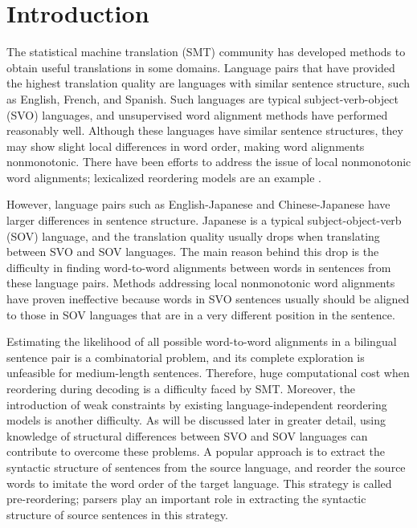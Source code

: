 \documentclass[english]{jnlp_1.4}
\begin{document}
\maketitle


\section{Introduction}
\label{sec:introduction}

The statistical machine translation (SMT) community has developed methods to 
obtain useful translations in some domains. Language pairs that have provided 
the highest translation quality are languages with similar sentence structure, 
such as English, French, and Spanish. Such languages are typical subject-verb-object (SVO) 
languages, and unsupervised word alignment methods \cite{Brown1993,Yamada2001,Zens2002,Koehn2003} 
have performed reasonably well. Although these languages have similar sentence 
structures, they may show slight local differences in word order, making word 
alignments nonmonotonic. There have been efforts to address the issue of local 
nonmonotonic word alignments; lexicalized reordering models are an example \cite{Tillmann2004,Koehn2005,Galley2008}.

However, language pairs such as English-Japanese and Chinese-Japanese have larger 
differences in sentence structure. Japanese is a typical subject-object-verb (SOV) 
language, and the translation quality usually drops when translating between SVO 
and SOV languages. The main reason behind this drop is the difficulty in finding 
word-to-word alignments between words in sentences from these language pairs. 
Methods addressing local nonmonotonic word alignments have proven ineffective 
because words in SVO sentences usually should be aligned to those in SOV languages 
that are in a very different position in the sentence.

Estimating the likelihood of all possible word-to-word alignments in a bilingual 
sentence pair is a combinatorial problem, and its complete exploration is unfeasible 
for medium-length sentences. Therefore, huge computational cost when reordering 
during decoding is a difficulty faced by SMT. Moreover, the introduction of weak 
constraints by existing language-independent reordering models is another difficulty. 
As will be discussed later in greater detail, using knowledge of structural differences 
between SVO and SOV languages can contribute to overcome these problems. A popular 
approach is to extract the syntactic structure of sentences from the source language, 
and reorder the source words to imitate the word order of the target language. This 
strategy is called pre-reordering; parsers play an important role in extracting 
the syntactic structure of source sentences in this strategy.
\end{document}
